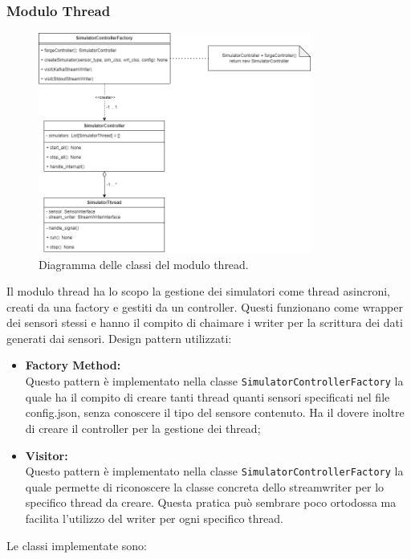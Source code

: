 \documentclass[8pt]{article}
\begin{document}
\subsubsection{Modulo Thread}
\begin{figure}[h!]
    \centering
    \includegraphics[width=0.8\textwidth]{images_st/threads.png}
    \caption{Diagramma delle classi del modulo thread.}
    \label{fig:Diagramma delle classi del modulo thread}
\end{figure}
Il modulo thread ha lo scopo la gestione dei simulatori come thread asincroni, creati da una factory e gestiti da un controller. Questi funzionano come wrapper dei sensori stessi e hanno il compito di chaimare i writer per la scrittura dei dati generati dai sensori.
Design pattern utilizzati: 
\begin{itemize}
    \item \textbf{Factory Method:} 
    \\Questo pattern è implementato nella classe \verb|SimulatorControllerFactory| la quale ha il compito di creare tanti thread quanti sensori specificati nel file config.json, senza conoscere il tipo del sensore contenuto. Ha il dovere inoltre di creare il controller per la gestione dei thread;
    \item \textbf{Visitor:}
    \\Questo pattern è implementato nella classe \verb|SimulatorControllerFactory| la quale permette di riconoscere la classe concreta dello streamwriter per lo specifico thread da creare. Questa pratica può sembrare poco ortodossa ma facilita l'utilizzo del writer per ogni specifico thread.
\end{itemize}
Le classi implementate sono:
\end{document}

